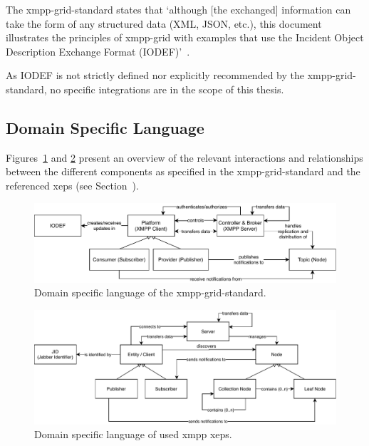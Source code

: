 The \gls{xmpp-grid-standard} states that `although [the exchanged] information can take the form of any structured data (XML, JSON, etc.), this document illustrates the principles of \gls{xmpp-grid} with examples that use the Incident Object Description Exchange Format (IODEF)'~\cite{rfc7970, ietf-mile-xmpp-grid-05}.

As IODEF is not strictly defined nor explicitly recommended by the \gls{xmpp-grid-standard}, no specific integrations are in the scope of this thesis.

\subsection{Domain Specific Language}

Figures~\ref{fig:architecturedslgriddraft} and \ref{fig:architecturedslxeps} present an overview of the relevant interactions and relationships between the different components as specified in the \gls{xmpp-grid-standard} and the referenced \glspl{xep} (see Section~).

\begin{figure}[h]
\centering
\includegraphics[width=\linewidth]{resources/architecture_dsl_grid_draft}
\caption[DSL of the XMPP-Grid standard]{Domain specific language of the \gls{xmpp-grid-standard}.}
\label{fig:architecturedslgriddraft}
\end{figure}

\begin{figure}[h]
\centering
\includegraphics[width=\linewidth]{resources/architecture_dsl_xeps}
\caption[DSL of used XMPP XEPs]{Domain specific language of used \gls{xmpp} \glspl{xep}.}
\label{fig:architecturedslxeps}
\end{figure}

